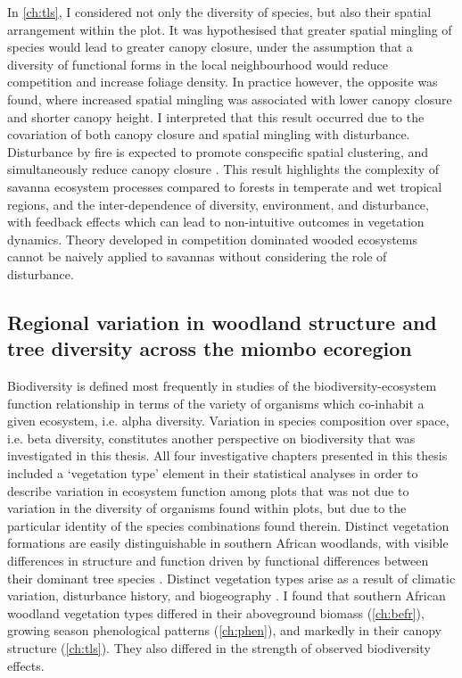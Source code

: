\begin{refsection}
In \autoref{ch:tls}, I considered not only the diversity of species, but also their spatial arrangement within the plot. It was hypothesised that greater spatial mingling of species would lead to greater canopy closure, under the assumption that a diversity of functional forms in the local neighbourhood would reduce competition and increase foliage density. In practice however, the opposite was found, where increased spatial mingling was associated with lower canopy closure and shorter canopy height. I interpreted that this result occurred due to the covariation of both canopy closure and spatial mingling with disturbance. Disturbance by fire is expected to promote conspecific spatial clustering, and simultaneously reduce canopy closure \citep{Martens2000}. This result highlights the complexity of savanna ecosystem processes compared to forests in temperate and wet tropical regions, and the inter-dependence of diversity, environment, and disturbance, with feedback effects which can lead to non-intuitive outcomes in vegetation dynamics. Theory developed in competition dominated wooded ecosystems cannot be naively applied to savannas without considering the role of disturbance.

\subsection{Regional variation in woodland structure and tree diversity across the miombo ecoregion}
\label{discussion:ssec:veg_type}

Biodiversity is defined most frequently in studies of the biodiversity-ecosystem function relationship in terms of the variety of organisms which co-inhabit a given ecosystem, i.e. alpha diversity. Variation in species composition over space, i.e. beta diversity, constitutes another perspective on biodiversity that was investigated in this thesis. All four investigative chapters presented in this thesis included a `vegetation type' element in their statistical analyses in order to describe variation in ecosystem function among plots that was not due to variation in the diversity of organisms found within plots, but due to the particular identity of the species combinations found therein. Distinct vegetation formations are easily distinguishable in southern African woodlands, with visible differences in structure and function driven by functional differences between their dominant tree species \citep{Solbrig1996}. Distinct vegetation types arise as a result of climatic variation, disturbance history, and biogeography \citep{Fayolle2018}. I found that southern African woodland vegetation types differed in their aboveground biomass (\autoref{ch:befr}), growing season phenological patterns (\autoref{ch:phen}), and markedly in their canopy structure (\autoref{ch:tls}). They also differed in the strength of observed biodiversity effects. 


\end{refsection}
